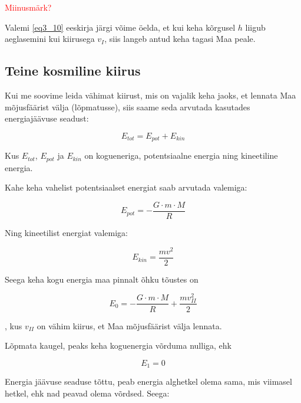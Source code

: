\begin{flushleft}
\textcolor{red}{Miinusmärk?}

Valemi \ref{eq3_10} eeskirja järgi võime öelda, et kui keha kõrgusel $h$ liigub aeglasemini kui kiirusega $v_{I}$, siis langeb antud keha tagasi Maa peale.

\vspace{5mm}
\subsection{Teine kosmiline kiirus}

\vspace{5mm}
Kui me soovime leida vähimat kiirust, mis on vajalik keha jaoks, et lennata Maa mõjusfäärist välja (lõpmatusse), siis saame seda arvutada kasutades energiajäävuse seadust:

\begin{equation}
\label{eq3_11}
E_{tot}= E_{pot} + E_{kin}
\end{equation}

Kus $E_{tot}$, $E_{pot}$ ja $E_{kin}$ on kogueneriga, potentsiaalne energia ning kineetiline energia.

Kahe keha vahelist potentsiaalset energiat saab arvutada valemiga:

\begin{equation}
\label{eq3_12}
E_{pot} = - \dfrac{G\cdot m \cdot M}{R}
\end{equation}

Ning kineetilist energiat valemiga:

\begin{equation}
\label{eq3_13}
E_{kin} = \dfrac{mv^{2}}{2}
\end{equation}

\vspace{5mm}
Seega keha kogu energia maa pinnalt õhku tõustes on

\begin{equation}
\label{eq3_14}
E_{0}= - \dfrac{G\cdot m \cdot M}{R} + \dfrac{mv_{II}^{2}}{2}
\end{equation}

, kus $v_{II}$ on vähim kiirus, et Maa mõjusfäärist välja lennata.

\vspace{5mm}
Lõpmata kaugel, peaks keha koguenergia võrduma nulliga, ehk

\begin{equation}
\label{eq3_15}
E_{1}= 0
\end{equation}

Energia jäävuse seaduse tõttu, peab energia alghetkel olema sama, mis viimasel hetkel, ehk nad peavad olema võrdsed. Seega:


\end{flushleft}
